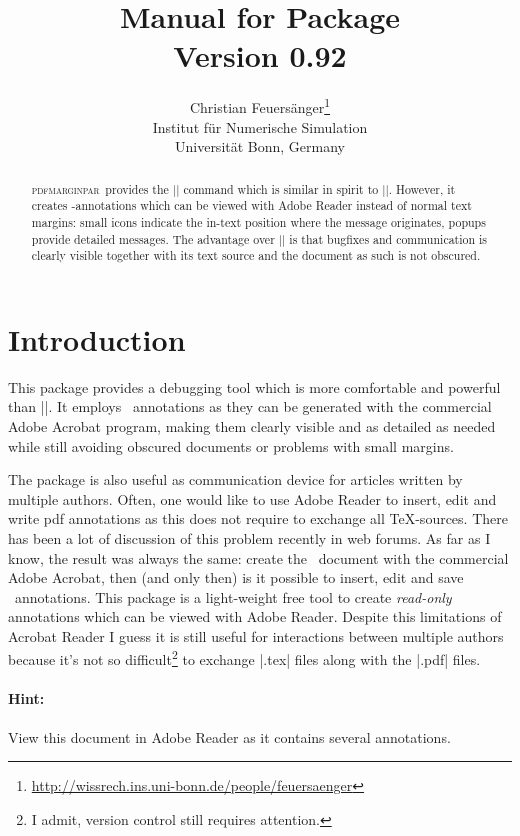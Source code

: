 \documentclass[a4paper]{ltxdoc}
\author{%
	Christian Feuers\"anger\footnote{\url{http://wissrech.ins.uni-bonn.de/people/feuersaenger}}\\%
	Institut f\"ur Numerische Simulation\\
	Universit\"at Bonn, Germany}
\title{
	Manual for Package \PDFMRG\\
	{\small Version 0.92}}
\newcommand\PDFMRG{\textsc{pdfmarginpar}}
\begin{document}
\maketitle
\begin{abstract}%
\PDFMRG\ provides the |\pdfmarginpar| command which is similar in spirit to |\marginpar|. However, it creates \pdf-annotations which can be viewed with Adobe Reader instead of normal text margins: small icons indicate the in-text position where the message originates, popups provide detailed messages. The advantage over |\marginpar| is that bugfixes and communication is clearly visible together with its text source and the document as such is not obscured.
\end{abstract}
\tableofcontents
\section{Introduction}
This package provides a debugging tool which is more comfortable and powerful than |\marginpar|. It employs \pdf\ annotations as they can be generated with the commercial Adobe Acrobat program, making them clearly visible and as detailed as needed while still avoiding obscured documents or problems with small margins.

The package is also useful as communication device for articles written by multiple authors. Often, one would like to use Adobe Reader to insert, edit and write pdf annotations as this does not require to exchange all \TeX-sources. There has been a lot of discussion of this problem recently in web forums. As far as I know, the result was always the same: create the \pdf\ document with the commercial Adobe Acrobat, then (and only then) is it possible to insert, edit and save \pdf\ annotations. This package is a light-weight free tool to create \emph{read-only} annotations which can be viewed with Adobe Reader. Despite this limitations of Acrobat Reader I guess it is still useful for interactions between multiple authors because it's not so difficult\footnote{I admit, version control still requires attention.} to exchange |.tex| files along with the |.pdf| files.

\paragraph{Hint:} View this document in Adobe Reader as it contains several annotations.
\end{document}
